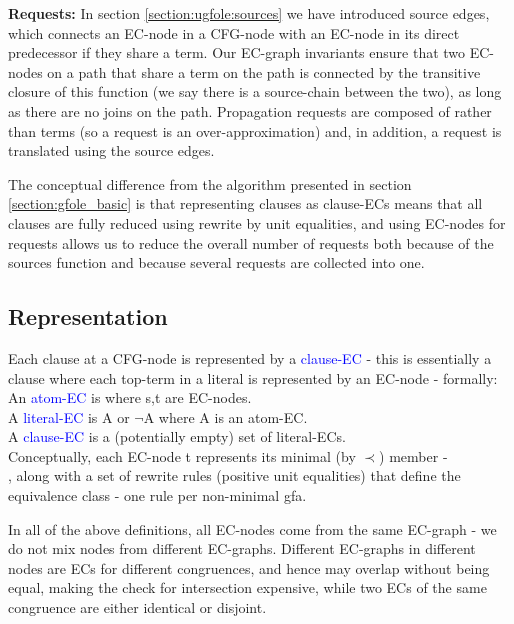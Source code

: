 \textbf{Requests:} In section \ref{section:ugfole:sources} we have introduced source edges, which connects an EC-node in a CFG-node with an EC-node in its direct predecessor if they share a term. Our EC-graph invariants ensure that two EC-nodes on a path that share a term on the path is connected by the transitive closure of this function (we say there is a source-chain between the two), as long as there are no joins on the path. Propagation requests are composed of \GFAs{} rather than terms (so a request is an over-approximation) and, in addition, a request is translated using the source edges.

\bigskip

The conceptual difference from the algorithm presented in section \ref{section:gfole_basic} is that representing clauses as clause-ECs means that all clauses are fully reduced using rewrite by unit equalities, and using EC-nodes for requests allows us to reduce the overall number of requests both because of the sources function and because several requests are collected into one.

\subsection*{Representation}
Each clause at a CFG-node is represented by a \textcolor{blue}{clause-EC} - this is essentially a clause where each top-term in a literal is represented by an EC-node - formally:\\
An \textcolor{blue}{atom-EC} is  where s,t are EC-nodes.\\
A \textcolor{blue}{literal-EC} is A or $\lnot$A where A is an atom-EC.\\
A \textcolor{blue}{clause-EC} is a (potentially empty) set of literal-ECs.\\
Conceptually, each EC-node t represents its minimal (by $\prec$) member	- \\
, 
along with a set of rewrite rules (positive unit equalities) that define the equivalence class - one rule per non-minimal gfa.

In all of the above definitions, all EC-nodes come from the same EC-graph - we do not mix nodes from different EC-graphs.
Different EC-graphs in different nodes are ECs for different congruences, and hence may overlap without being equal, making the check for intersection expensive, while two ECs of the same congruence are either identical or disjoint.

